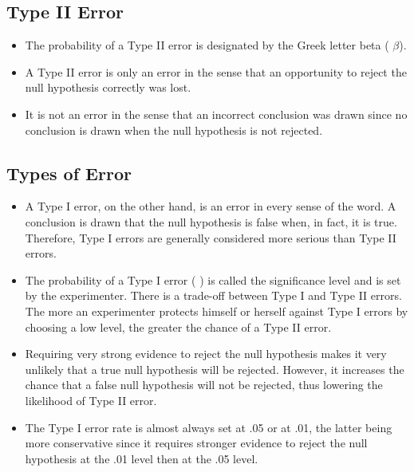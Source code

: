

\subsection{Type II Error}
\begin{itemize}

\item The probability of a Type II error is designated by the Greek letter beta ( $\beta$).
\item A Type II error is only an error in the sense that an opportunity to reject the null hypothesis correctly was lost.
\item It is not an error in the sense that an incorrect conclusion was drawn since no conclusion is drawn when the null hypothesis is not rejected.
\end{itemize}


\subsection{Types of Error}
\begin{itemize}
\item
A Type I error, on the other hand, is an error in every sense of the word. A conclusion is drawn that the null hypothesis is false when, in fact, it is true. Therefore, Type I errors are generally considered more serious than Type II errors.
\item
The probability of a Type I error ( ) is called the significance level and is set by the experimenter. There is a trade-off between Type I and Type II errors. The more an experimenter protects himself or herself against Type I errors by choosing a low level, the greater the chance of a Type II error.
\item
Requiring very strong evidence to reject the null hypothesis makes it very unlikely that a true null hypothesis will be rejected. However, it increases the chance that a false null hypothesis will not be rejected, thus lowering the likelihood of Type II error.
\item
The Type I error rate is almost always set at .05 or at .01, the latter being more conservative since it requires stronger evidence to reject the null hypothesis at the .01 level then at the .05 level.
\end{itemize}

